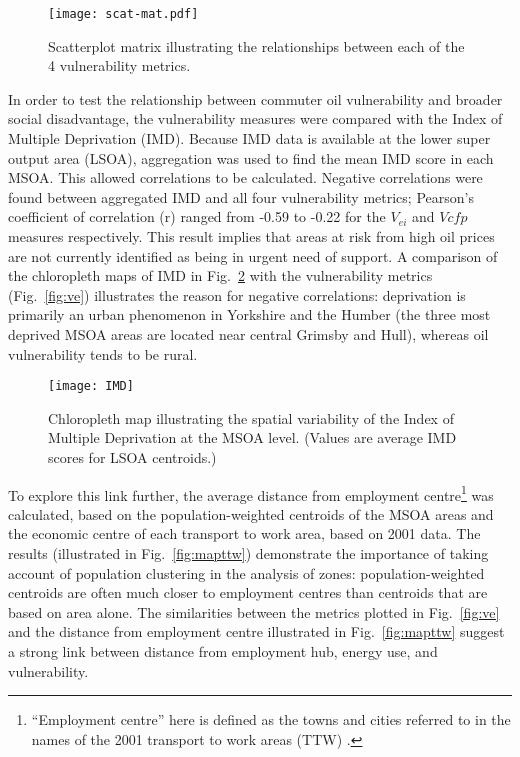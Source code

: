 \begin{figure}[t]
 \centering
\texttt{[image: scat-mat.pdf]}
 \caption[Scatterplot matrix of vulnerability metrics]
 {Scatterplot matrix illustrating the relationships between each of
the 4 vulnerability metrics.}
 \label{fig:scat-mat}
\end{figure}

In order to test the relationship between commuter oil vulnerability and
broader social disadvantage, the vulnerability measures were compared
with the Index of Multiple Deprivation (IMD). Because IMD data is available
at the lower super output area (LSOA), aggregation was used to find the mean
IMD score in each MSOA. This allowed correlations to be calculated.
Negative correlations were found between aggregated IMD and
all four vulnerability metrics;
Pearson's coefficient of correlation
(r) ranged from -0.59 to -0.22
for the $V_{ei}$ and $V{cfp}$ measures respectively.
This result implies that
areas at risk from high oil prices are not currently identified as
being in urgent need of support. A comparison of the chloropleth maps
of IMD in Fig.~\ref{fig:IMD} with the vulnerability metrics
(Fig.~\ref{fig:ve}) illustrates the reason
for negative correlations: deprivation is primarily an urban phenomenon in
Yorkshire and the Humber (the three most deprived MSOA areas
are located near central Grimsby and Hull),
whereas oil vulnerability tends to be rural.

\begin{figure}[t]
 \centering
\texttt{[image: IMD]}
 \caption[Chloropleth map of deprivation in Yorkshire and the Humber]
 {Chloropleth map illustrating the spatial variability of
the Index of Multiple Deprivation at the MSOA level. (Values are
average IMD scores for LSOA centroids.)}
 \label{fig:IMD}
\end{figure}

To explore this link further, the average distance from employment
centre\footnote{``Employment centre'' here is defined as the towns and cities
referred to in the names of the 2001 transport to work areas (TTW)
\citep{ONS2011-ttw}.} was calculated, based on the population-weighted centroids
of the MSOA areas and the economic centre of each transport to work area, based
on 2001 data. The results (illustrated in Fig.~\ref{fig:mapttw}) demonstrate
the importance of taking account of population clustering in the analysis of
zones: population-weighted centroids are often much closer to employment
centres than centroids that are based on area alone.
The similarities between
the metrics plotted in Fig.~\ref{fig:ve}
and the distance from employment centre illustrated in Fig.~\ref{fig:mapttw}
suggest a strong link between distance from employment hub, energy use, and
vulnerability.

